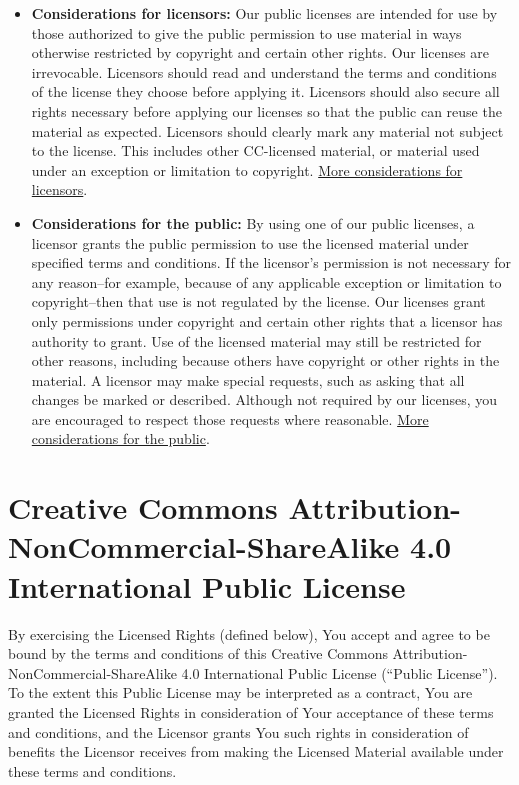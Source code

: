 \documentclass[]{book}
\begin{document}
\begin{itemize}
\item
  \textbf{Considerations for licensors:} Our public licenses are intended for use by those authorized to give the public permission to use material in ways otherwise restricted by copyright and certain other rights. Our licenses are irrevocable. Licensors should read and understand the terms and conditions of the license they choose before applying it. Licensors should also secure all rights necessary before applying our licenses so that the public can reuse the material as expected. Licensors should clearly mark any material not subject to the license. This includes other CC-licensed material, or material used under an exception or limitation to copyright. \href{http://wiki.creativecommons.org/Considerations_for_licensors_and_licensees\#Considerations_for_licensors}{More considerations for licensors}.
\item
  \textbf{Considerations for the public:} By using one of our public licenses, a licensor grants the public permission to use the licensed material under specified terms and conditions. If the licensor's permission is not necessary for any reason--for example, because of any applicable exception or limitation to copyright--then that use is not regulated by the license. Our licenses grant only permissions under copyright and certain other rights that a licensor has authority to grant. Use of the licensed material may still be restricted for other reasons, including because others have copyright or other rights in the material. A licensor may make special requests, such as asking that all changes be marked or described. Although not required by our licenses, you are encouraged to respect those requests where reasonable. \href{http://wiki.creativecommons.org/Considerations_for_licensors_and_licensees\#Considerations_for_licensees}{More considerations for the public}.
\end{itemize}

\hypertarget{creative-commons-attribution-noncommercial-sharealike-4.0-international-public-license}{%
\section{Creative Commons Attribution-NonCommercial-ShareAlike 4.0 International Public License}\label{creative-commons-attribution-noncommercial-sharealike-4.0-international-public-license}}

By exercising the Licensed Rights (defined below), You accept and agree to be bound by the terms and conditions of this Creative Commons Attribution-NonCommercial-ShareAlike 4.0 International Public License (``Public License''). To the extent this Public License may be interpreted as a contract, You are granted the Licensed Rights in consideration of Your acceptance of these terms and conditions, and the Licensor grants You such rights in consideration of benefits the Licensor receives from making the Licensed Material available under these terms and conditions.
\end{document}
